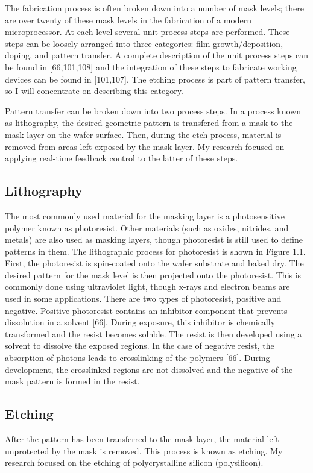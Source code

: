 \tab The fabrication process is often broken down into a number of mask levels; there are
over twenty of these mask levels in the fabrication of a modern microprocessor. At each level
several unit process steps are performed. These steps can be loosely arranged into three
categories: film growth/deposition, doping, and pattern transfer. A complete description
of the unit process steps can be found in [66,101,108] and the integration of these steps to
fabricate working devices can be found in [101,107]. The etching process is part of pattern
transfer, so I will concentrate on describing this category.

\tab Pattern transfer can be broken down into two process steps. In a process known as
lithography, the desired geometric pattern is transfered from a mask to the mask layer
on the wafer surface. Then, during the etch process, material is removed from areas left
exposed by the mask layer. My research focused on applying real-time feedback control to
the latter of these steps.

\subsection{Lithography}
\tab The most commonly used material for the masking layer is a photosensitive polymer known as photoresist. Other materials (such as oxides, nitrides, and metals) are also used as masking layers, though photoresist is still used to define patterns in them. The lithographic process for photoresist is shown in Figure 1.1. First, the photoresist is spin-coated onto the wafer substrate and baked dry. The desired pattern for the mask level is then projected onto the photoresist. This is commonly done using ultraviolet light, though x-rays and electron beams are used in some applications. There are two types of photoresist, positive and negative. Positive photoresist contains an inhibitor component that prevents dissolution in a solvent [66]. During exposure, this inhibitor is chemically transformed and the resist becomes solnble. The resist is then developed using a solvent to dissolve the exposed regions. In the case of negative resist, the absorption of photons leads to crosslinking of the polymers [66]. During development, the crosslinked regions are not dissolved and the negative of the mask pattern is formed in the resist.

\subsection{Etching}
\tab After the pattern has been transferred to the mask layer, the material left unprotected by the mask is removed. This process is known as etching. My research focused on the etching of polycrystalline silicon (polysilicon).

